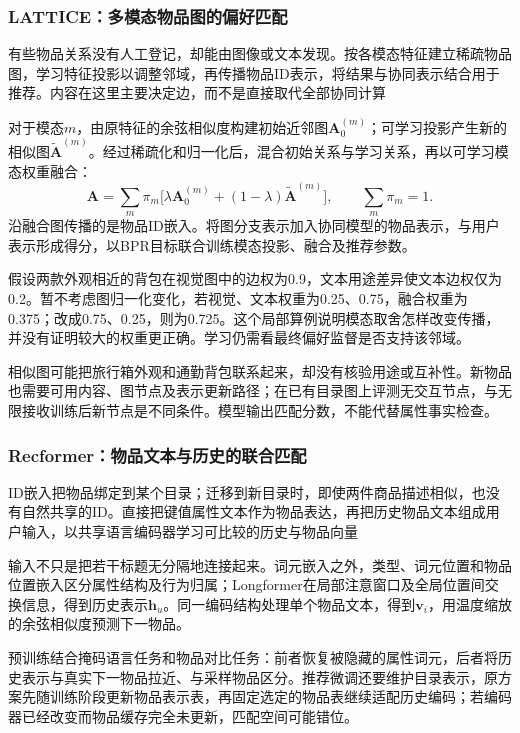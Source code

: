 \subsubsection{LATTICE：多模态物品图的偏好匹配}
\label{sec:rs-lattice}

有些物品关系没有人工登记，却能由图像或文本发现。按各模态特征建立稀疏物品图，学习特征投影以调整邻域，再传播物品ID表示，将结果与协同表示结合用于推荐。内容在这里主要决定边，而不是直接取代全部协同计算

对于模态$m$，由原特征的余弦相似度构建初始近邻图$\bm{A}^{(m)}_0$；可学习投影产生新的相似图$\widetilde{\bm{A}}^{(m)}$。经过稀疏化和归一化后，混合初始关系与学习关系，再以可学习模态权重融合：
\begin{equation}
  \bm{A}=\sum_m\pi_m
   \bigl[\lambda\bm{A}^{(m)}_0
          +(1-\lambda)\widetilde{\bm{A}}^{(m)}\bigr],
  \qquad \sum_m\pi_m=1.
  \label{eq:rs-lattice-graph}
\end{equation}
沿融合图传播的是物品ID嵌入。将图分支表示加入协同模型的物品表示，与用户表示形成得分，以BPR目标联合训练模态投影、融合及推荐参数。

假设两款外观相近的背包在视觉图中的边权为0.9，文本用途差异使文本边权仅为0.2。暂不考虑图归一化变化，若视觉、文本权重为0.25、0.75，融合权重为0.375；改成0.75、0.25，则为0.725。这个局部算例说明模态取舍怎样改变传播，并没有证明较大的权重更正确。学习仍需看最终偏好监督是否支持该邻域。

相似图可能把旅行箱外观和通勤背包联系起来，却没有核验用途或互补性。新物品也需要可用内容、图节点及表示更新路径；在已有目录图上评测无交互节点，与无限接收训练后新节点是不同条件。模型输出匹配分数，不能代替属性事实检查。

\subsubsection{Recformer：物品文本与历史的联合匹配}
\label{sec:rs-recformer}

ID嵌入把物品绑定到某个目录；迁移到新目录时，即使两件商品描述相似，也没有自然共享的ID。直接把键值属性文本作为物品表达，再把历史物品文本组成用户输入，以共享语言编码器学习可比较的历史与物品向量

输入不只是把若干标题无分隔地连接起来。词元嵌入之外，类型、词元位置和物品位置嵌入区分属性结构及行为归属；Longformer在局部注意窗口及全局位置间交换信息，得到历史表示$\bm{h}_u$。同一编码结构处理单个物品文本，得到$\bm{v}_i$，用温度缩放的余弦相似度预测下一物品。

预训练结合掩码语言任务和物品对比任务：前者恢复被隐藏的属性词元，后者将历史表示与真实下一物品拉近、与采样物品区分。推荐微调还要维护目录表示，原方案先随训练阶段更新物品表示表，再固定选定的物品表继续适配历史编码；若编码器已经改变而物品缓存完全未更新，匹配空间可能错位。

